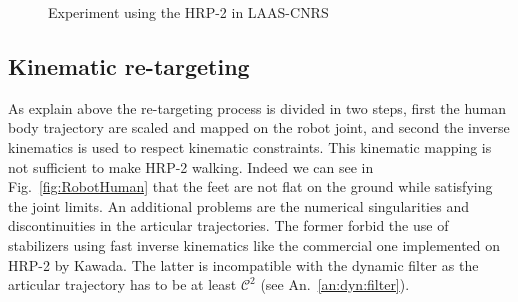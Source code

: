 \begin{figure}[h]
  \begin{center}
    \hspace*{2cm}
    \caption{Experiment using the HRP-2 in LAAS-CNRS}
    \label{fig:renonculacees}
  \end{center}
\end{figure}

\subsection{Kinematic re-targeting}

As explain above the re-targeting process is divided in two steps, first the human body trajectory are scaled and mapped on the robot joint, and second the inverse kinematics is used to respect kinematic constraints.
This kinematic mapping is not sufficient to make HRP-2 walking.
Indeed we can see in Fig.~\ref{fig:RobotHuman} that the feet are not flat on the ground while satisfying the joint limits.
An additional problems are the numerical singularities and discontinuities in the articular trajectories.
The former forbid the use of stabilizers using fast inverse kinematics like the commercial one implemented on HRP-2 by Kawada.
The latter is incompatible with the dynamic filter as the articular trajectory has to be at least $\mathcal{C}^2$ (see An.~\ref{an:dyn:filter}).

